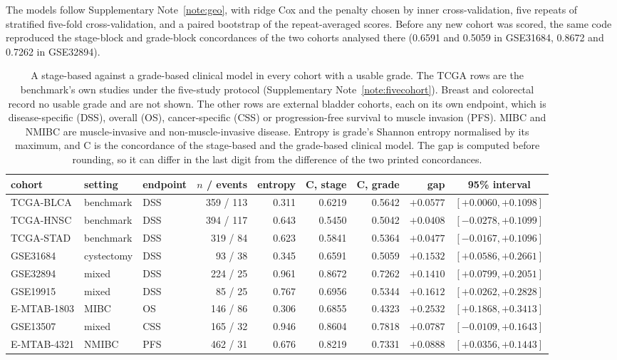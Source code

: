 \documentclass[11pt]{article}
\begin{document}
The models follow Supplementary Note~\ref{note:geo}, with ridge Cox and the penalty chosen by inner
cross-validation, five repeats of stratified five-fold cross-validation, and a paired bootstrap of the
repeat-averaged scores. Before any new cohort was scored, the same code reproduced the stage-block and
grade-block concordances of the two cohorts analysed there (0.6591 and 0.5059 in GSE31684, 0.8672 and
0.7262 in GSE32894).

\begin{table}[h]
\centering
{\footnotesize
\setlength{\tabcolsep}{2.5pt}
\begin{tabular}{lllrrrrrc}
\toprule
cohort & setting & endpoint & $n$ / events & entropy & C, stage & C, grade & gap & 95\% interval \\
\midrule
TCGA-BLCA & benchmark & DSS & 359 / 113 & 0.311 & 0.6219 & 0.5642 & $+0.0577$ & $[+0.0060, +0.1098]$ \\
TCGA-HNSC & benchmark & DSS & 394 / 117 & 0.643 & 0.5450 & 0.5042 & $+0.0408$ & $[-0.0278, +0.1099]$ \\
TCGA-STAD & benchmark & DSS & 319 / 84 & 0.623 & 0.5841 & 0.5364 & $+0.0477$ & $[-0.0167, +0.1096]$ \\
GSE31684 & cystectomy & DSS & 93 / 38 & 0.345 & 0.6591 & 0.5059 & $+0.1532$ & $[+0.0586, +0.2661]$ \\
GSE32894 & mixed & DSS & 224 / 25 & 0.961 & 0.8672 & 0.7262 & $+0.1410$ & $[+0.0799, +0.2051]$ \\
GSE19915 & mixed & DSS & 85 / 25 & 0.767 & 0.6956 & 0.5344 & $+0.1612$ & $[+0.0262, +0.2828]$ \\
E-MTAB-1803 & MIBC & OS & 146 / 86 & 0.306 & 0.6855 & 0.4323 & $+0.2532$ & $[+0.1868, +0.3413]$ \\
GSE13507 & mixed & CSS & 165 / 32 & 0.946 & 0.8604 & 0.7818 & $+0.0787$ & $[-0.0109, +0.1643]$ \\
E-MTAB-4321 & NMIBC & PFS & 462 / 31 & 0.676 & 0.8219 & 0.7331 & $+0.0888$ & $[+0.0356, +0.1443]$ \\
\bottomrule
\end{tabular}}
\caption{A stage-based against a grade-based clinical model in every cohort with a usable grade. The
TCGA rows are the benchmark's own studies under the five-study protocol (Supplementary
Note~\ref{note:fivecohort}). Breast and colorectal record no usable grade and are not shown. The
other rows are external bladder cohorts, each on its own endpoint, which is disease-specific (DSS),
overall (OS), cancer-specific (CSS) or progression-free survival to muscle invasion (PFS). MIBC and NMIBC are
muscle-invasive and non-muscle-invasive disease. Entropy is grade's Shannon entropy normalised by its
maximum, and C is the concordance of the stage-based and the grade-based clinical model. The gap is computed before rounding, so it can differ in the last digit
from the difference of the two printed concordances.}
\label{tab:gapext}
\end{table}
\end{document}
